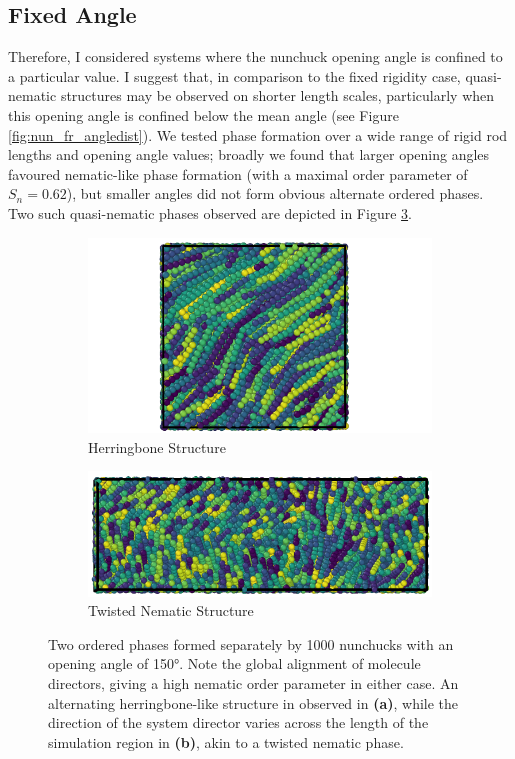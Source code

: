 \documentclass[11pt, a4paper]{article} %
\begin{document}
\subsection{Fixed Angle}
Therefore, I considered systems where the nunchuck opening angle is confined to a particular value. I suggest that, in comparison to the fixed rigidity case, quasi-nematic structures may be observed on shorter length scales, particularly when this opening angle is confined below the mean angle (see Figure \ref{fig:nun_fr_angledist}).
We tested phase formation over a wide range of rigid rod lengths and opening angle values; broadly we found that larger opening angles favoured nematic-like phase formation (with a maximal order parameter of $S_{n} = 0.62$), but smaller angles did not form obvious alternate ordered phases. Two such quasi-nematic phases observed are depicted in Figure \ref{fig:nun_fa_views}.

\begin{figure}
	\vspace{0.5cm}
	\centering
	\begin{subfigure}{.4\textwidth}
		\centering
		\includegraphics[width=.9\linewidth]{Figures/nun_fa_herringbone}
		\caption{Herringbone Structure}
		\label{fig:nun_fa_herringbone}
	\end{subfigure}%
	\begin{subfigure}{.6\textwidth}
		\centering
		\includegraphics[width=.9\linewidth]{Figures/nun_fa_twist}
		\caption{Twisted Nematic Structure}
		\label{fig:nun_fa_twist}
	\end{subfigure}
	\caption{Two ordered phases formed separately by \num{1000} nunchucks with an opening angle of \ang{150}. Note the global alignment of molecule directors, giving a high nematic order parameter in either case. An alternating herringbone-like structure in observed in \textbf{(a)}, while the direction of the system director varies across the length of the simulation region in \textbf{(b)}, akin to a twisted nematic phase.}
	\label{fig:nun_fa_views}
\end{figure}
\end{document}
